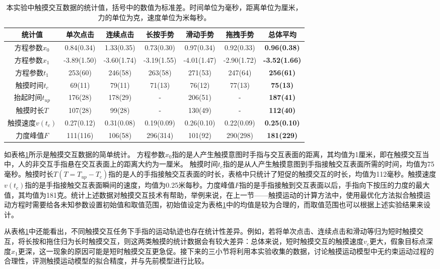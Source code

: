 \begin{table}
	\centering
	\caption{本实验中触摸交互数据的统计值，括号中的数值为标准差。时间单位为毫秒，距离单位为厘米，力的单位为克，速度单位为米每秒。}
	\begin{tabular}{ccccccc}
		\toprule
		统计值 & 单次点击 & 连续点击 & 长按手势  & 滑动手势 & 拖拽手势 & \textbf{总体平均} \\
		\midrule
		方程参数$x_0$ & 0.84(0.34) & 1.33(0.35) & 0.73(0.30) & 0.97(0.34) & 0.92(0.33) & \textbf{0.96(0.38)} \\
		方程参数$x_1$ & -3.89(1.50) & -3.60(1.74) & -3.19(1.55) & -4.01(1.47) & -2.90(1.72) & \textbf{-3.52(1.66)} \\
		方程参数$t_1$ & 253(60) & 246(58) & 263(58) & 271(53) & 247(64) & \textbf{256(61)} \\
		触摸时间$t_c$ & 69(11) & 79(11) & 71(13) & 76(12) & 77(13) & \textbf{75(13)} \\
		抬起时间$t_{up}$ & 176(28) & 178(29) & - & 206(51) & - & \textbf{187(41)} \\
		触摸时长$T$ & 107(28) & 99(28) & - & 130(49) & - & \textbf{112(40)} \\
		触摸速度$v(t_c)$ & 0.27(0.12) & 0.31(0.08) & 0.19(0.09) & 0.26(0.10) & 0.22(0.09) & \textbf{0.25(0.10)} \\
		力度峰值$F$ & 111(116) & 106(58) & 296(314) & 101(92) & 290(298) & \textbf{181(229)} \\
		\bottomrule
	\end{tabular}
	\label{tab:model_experiment_result}
\end{table}

如表格\ref{tab:model_experiment_result}所示是触摸交互数据的简单统计。
方程参数$x_0$指的是人产生触摸意图时手指与交互表面的距离，其均值为1厘米，即在触摸交互当中，人的非交互手指悬在交互表面上的距离大约为一厘米。
触摸时间$t_c$指的是从人产生触摸意图到手指接触交互表面所需的时间，均值为75毫秒。触摸时长$T(T=T_{up}-T_c)$指的是人的手指接触交互表面的时长，表格中只统计了短促的触摸交互的时长，均值为112毫秒。触摸速度$v(t_c)$指的是手指接触交互表面瞬间的速度，均值为0.25米每秒。力度峰值$F$指的是手指接触到交互表面以后，手指向下按压的力度的最大值，其均值为181克。统计上述数据对触摸交互技术有帮助，举例来说，在上一节——触摸运动的计算方法中，使用最优化方法拟合触摸运动方程时需要给各未知参数设置初始值和取值范围，初始值设定为表格\ref{tab:model_experiment_result}中的均值是较为合理的，而取值范围也可以根据上述实验结果来设计。

从表格\ref{tab:model_experiment_result}中还能看出，不同触摸交互任务下手指的运动轨迹也存在统计性差异。例如，若将单次点击、连续点击和滑动等归为短时触摸交互，将长按和拖住归为长时触摸交互，则这两类触摸的统计数据会有较大差异：总体来说，短时触摸交互的触摸速度$v_c$更大，假象目标点深度$x_1$更深，这一现象的原因可能是短时触摸交互更急促。接下来的三小节将利用本实验收集的数据，讨论触摸运动模型中无约束运动过程的合理性，评测触摸运动模型的拟合精度，并与先前模型进行比较。

